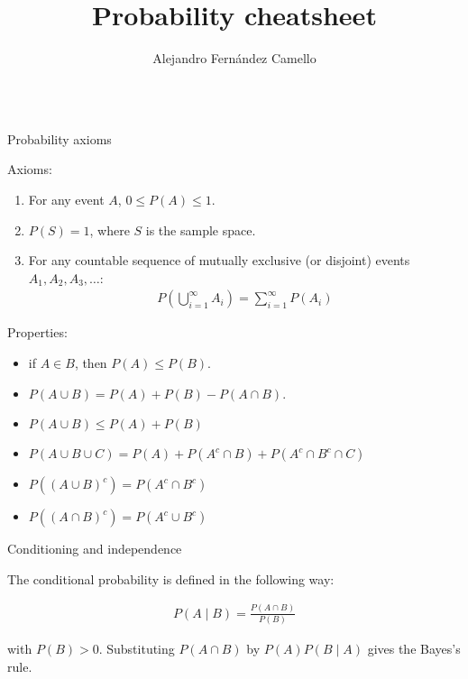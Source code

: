 \documentclass{beamer}
\title{Probability cheatsheet}
\author{Alejandro Fernández Camello}
\date{}
\begin{document}
\begin{frame}

\maketitle

\begin{columns}

\begin{column}{0.3\textwidth}
\begin{block}{Probability axioms}

Axioms:

\begin{enumerate}
    \item For any event $A$, $0 \leq P(A) \leq 1$.
    \item $P(S) = 1$, where $S$ is the sample space.
    \item For any countable sequence of mutually exclusive (or disjoint) events $A_1, A_2, A_3, \ldots$:
    \begin{align*}
        P\left( \bigcup_{i=1}^{\infty} A_i \right) = \sum_{i=1}^{\infty} P(A_i)
    \end{align*}
\end{enumerate}

Properties:

\begin{itemize}
    \item if $A \in B$, then $P(A) \leq P(B)$.
    \item $P(A \cup B) = P(A) + P(B) - P(A \cap B)$.
    \item $P(A \cup B) \leq P(A) + P(B)$
    \item $P(A \cup B \cup C) = P(A) + P(A^c \cap B) + P(A^c \cap B^c \cap C)$
    \item $P((A \cup B)^c) = P(A^c \cap B^c)$
    \item $P((A \cap B)^c) = P(A^c \cup B^c)$
\end{itemize}

\end{block}

\begin{block}{Conditioning and independence}

The conditional probability is defined in the following way:

\begin{align*}
    P(A \mid B) = \frac{P(A \cap B)}{P(B)}
\end{align*}

with $P(B) > 0$. Substituting $P(A \cap B)$ by $P(A)P(B \mid A)$ gives the Bayes's rule.


\end{block}
\end{column}
\end{columns}
\end{frame}
\end{document}
